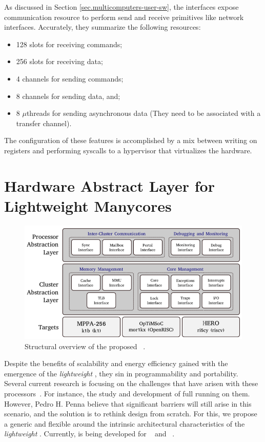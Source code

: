 		As discussed in Section \ref{sec.multicomputers-user-sw}, the \noc interfaces
		expose communication resource to perform send and receive primitives
		like network interfaces.
		Accurately, they summarize the following resources:

		\begin{itemize}
			\item 128 slots for receiving commands;
			\item 256 slots for receiving data;
			\item 4 channels for sending commands;
			\item 8 channels for sending data, and;
			\item 8 $\mu$threads for sending asynchronous data
				(They need to be associated with a transfer channel).
		\end{itemize}

		The configuration of these features is accomplished by a mix between
		writing on \dma registers and performing syscalls to a hypervisor
		that virtualizes the \mppa hardware.	
	
\section{Hardware Abstract Layer for Lightweight Manycores}
\label{sec.hal}

	\begin{figure}[h]
		\centering
		\includegraphics[width=.9\textwidth]{images/hal-struct.png}

		\caption{
			Structural overview of the proposed \hal~\cite{penna:compas2019}.
		}\par
		\label{fig.hal-struct}
	\end{figure}
	
	Despite the benefits of scalability and energy efficiency gained with the
	emergence of the \textit{lightweight \manycores}, they sin in programmability
	and portability.
	Several current research is focusing on the challenges that have arisen with
	these processors~\cite{christgau2017, gamell2012, serres2011}.
	For instance, the study and development of full \oses running on them.
	However, Pedro H. Penna \etal believe that significant barriers will still
	arise in this scenario, and the solution is to rethink \os design from scratch.
	For this, we propose a generic and flexible \hal around the intrinsic
	architectural characteristics of the \textit{lightweight \manycores}.
	Currently, \hal is being developed for \mppa~\cite{DeDinechin2013-1} and
	\optimsoc~\cite{Wallentowitz2013}.

